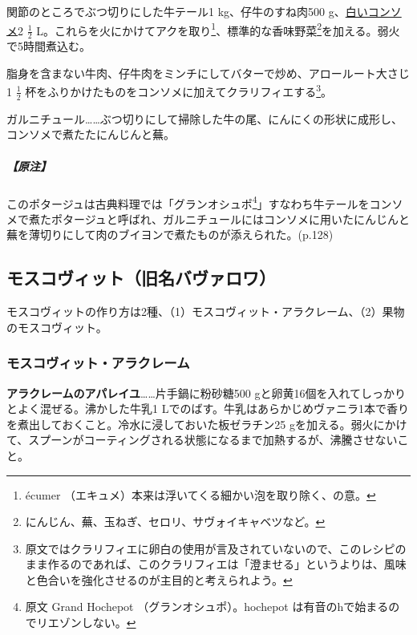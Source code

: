 関節のところでぶつ切りにした牛テール1 kg、仔牛のすね肉500
g、\protect\hyperlink{consomme-blanc-simple}{白いコンソメ}2
\(\frac{1}{2}\) L。これらを火にかけてアクを取り\footnote{écumer
  （エキュメ）本来は浮いてくる細かい泡を取り除く、の意。}、標準的な香味野菜\footnote{にんじん、蕪、玉ねぎ、セロリ、サヴォイキャベツなど。}を加える。弱火で5時間煮込む。

脂身を含まない牛肉、仔牛肉をミンチにしてバターで炒め、アロールート大さじ1
\(\frac{1}{2}\)
杯をふりかけたものをコンソメに加えてクラリフィエする\footnote{原文ではクラリフィエに卵白の使用が言及されていないので、このレシピのまま作るのであれば、このクラリフィエは「澄ませる」というよりは、風味と色合いを強化させるのが主目的と考えられよう。}。

ガルニチュール\ldots{}\ldots{}ぶつ切りにして掃除した牛の尾、にんにくの形状に成形し、コンソメで煮たたにんじんと蕪。

\hypertarget{ux539fux6ce8}{%
\subparagraph{【原注】}\label{ux539fux6ce8}}

このポタージュは古典料理では「グランオシュポ\footnote{原文 Grand
  Hochepot （グランオシュポ）。hochepot
  は有音のhで始まるのでリエゾンしない。}」すなわち牛テールをコンソメで煮たポタージュと呼ばれ、ガルニチュールにはコンソメに用いたにんじんと蕪を薄切りにして肉のブイヨンで煮たものが添えられた。(p.128)

\hypertarget{moscovite}{%
\subsection{モスコヴィット（旧名バヴァロワ）}\label{moscovite}}

\href{ex.Bavarois\%20を料理名としてどう扱うか要検討}{}

モスコヴィットの作り方は2種、（1）モスコヴィット・アラクレーム、（2）果物のモスコヴィット。

\hypertarget{moscovite-a-la-creme}{%
\subsubsection{モスコヴィット・アラクレーム}\label{moscovite-a-la-creme}}



\textbf{アラクレームのアパレイユ}\ldots{}\ldots{}片手鍋に粉砂糖500
gと卵黄16個を入れてしっかりとよく混ぜる。沸かした牛乳1
Lでのばす。牛乳はあらかじめヴァニラ1本で香りを煮出しておくこと。冷水に浸しておいた板ゼラチン25
gを加える。弱火にかけて、スプーンがコーティングされる状態になるまで加熱するが、沸騰させないこと。

